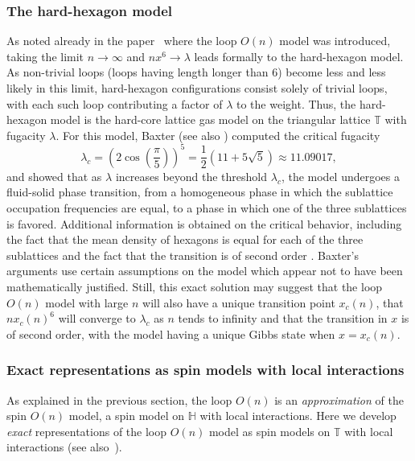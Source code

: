 \documentclass[12pt,reqno]{article}
\def\T{\mathbb{T}}
\newcommand{\HH}{\mathbb{H}}
\begin{document}
\subsubsection{The hard-hexagon model}
\label{sec:hard-hex}

As noted already in the paper~\cite{DomMukNie81} where the loop $O(n)$ model was introduced,
taking the limit $n\to\infty$ and $nx^6\to\lambda$ leads formally to
the hard-hexagon model. As non-trivial loops (loops having length longer than $6$) become
less and less likely in this limit, hard-hexagon configurations
consist solely of trivial loops, with each such loop contributing a
factor of $\lambda$ to the weight. Thus, the hard-hexagon model is
the hard-core lattice gas model on the triangular lattice $\T$ with
fugacity $\lambda$. For this model, Baxter \cite{Bax80} (see also
\cite[Chapter 14]{Bax89}) computed the critical fugacity
\begin{equation*}
\lambda_c = \left(2\cos\left(\frac{\pi}{5}\right)\right)^5 = \frac{1}{2}\left(11 + 5\sqrt{5}\right) \approx 11.09017,
\end{equation*}
and showed that as $\lambda$ increases beyond the threshold
$\lambda_c$, the model undergoes a fluid-solid phase transition, from
a homogeneous phase in which the sublattice occupation frequencies
are equal, to a phase in which one of the three sublattices is
favored. Additional information is obtained on the critical behavior,
including the fact that the mean density of hexagons is equal for
each of the three sublattices \cite[Equation (13)]{Bax80} and the
fact that the transition is of second order \cite[Equation
(9)]{Bax80}. Baxter's arguments use certain assumptions on the model
which appear not to have been mathematically justified. Still, this
exact solution may suggest that the loop $O(n)$ model with large $n$
will also have a unique transition point $x_c(n)$, that $nx_c(n)^6$
will converge to $\lambda_c$ as $n$ tends to infinity and that the
transition in $x$ is of second order, with the model having a unique
Gibbs state when $x = x_c(n)$.


\subsubsection{Exact representations as spin models with local interactions}
\label{sec:loop-O-n-exact-representations}

As explained in the previous section, the loop $O(n)$ is an \emph{approximation} of the spin $O(n)$ model, a spin model on $\HH$ with local interactions. Here we develop \emph{exact} representations of the loop $O(n)$ model as spin models on $\T$ with local interactions (see also~\cite{cardy2008conformal}).
\end{document}
